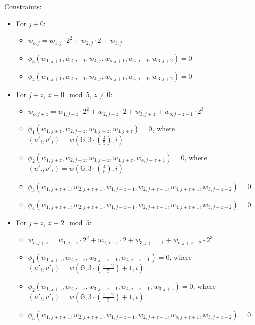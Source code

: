 Constraints:
\begin{itemize}
	\item For $j + 0$:
	\begin{itemize}
		\item $w_{o, j} = w_{1, j} \cdot 2^2 + w_{2, j} \cdot 2 + w_{3, j}$ 
		\item $\phi_3(w_{1, j + 1}, w_{2, j + 1}, w_{4, j}, w_{o, j + 1}, w_{4, j + 1}, w_{3, j + 2}) = 0$
		\item $\phi_4(w_{1, j + 1}, w_{2, j + 1}, w_{4, j}, w_{o, j + 1}, w_{4, j + 1}, w_{3, j + 2}) = 0$
	\end{itemize}
	\item For $j + z$, $z \equiv 0 \mod 5$, $z \neq 0$:
	\begin{itemize}
		\item $w_{o, j + z} = w_{1, j + z} \cdot 2^2 + w_{2, j + z} \cdot 2 + w_{3, j + z} + w_{o, j + z - 1} \cdot 2^3$ 
		\item $\phi_1(w_{1, j + z}, w_{2, j + z}, w_{3, j + z}, w_{4, j + z}) = 0$, where $(u'_{i}, v'_{i}) = w(\mathbb{G}, 3 \cdot (\frac{z}{5}), i)$
		\item $\phi_2(w_{1, j + z}, w_{2, j + z}, w_{3, j + z}, w_{4, j + z}, w_{o, j + z + 1}) = 0$, where $(u'_{i}, v'_{i}) = w(\mathbb{G}, 3 \cdot (\frac{z}{5}), i)$
		\item $\phi_3(w_{1, j + z + 1}, w_{2, j + z + 1}, w_{1, j + z - 1}, w_{2, j + z - 1}, w_{4, j + z + 1}, w_{3, j + z + 2}) = 0$
		\item $\phi_4(w_{1, j + z + 1}, w_{2, j + z + 1}, w_{1, j + z - 1}, w_{2, j + z - 1}, w_{4, j + z + 1}, w_{3, j + z + 2}) = 0$
	\end{itemize}
	\item For $j + z$, $z \equiv 2 \mod 5$:
	\begin{itemize}
		\item $w_{o, j + z} = w_{1, j + z} \cdot 2^2 + w_{2,j + z} \cdot 2 + w_{3, j + z - 1} + w_{o, j+ z - 2} \cdot 2^3$
		\item $\phi_1(w_{1, j + z}, w_{2, j + z}, w_{3, j + z - 1}, w_{4, j + z - 1}) = 0$, where $(u'_{i}, v'_{i}) = w(\mathbb{G}, 3 \cdot (\frac{z - 2}{5}) + 1, i)$
		\item $\phi_2(w_{1, j + z}, w_{2, j + z}, w_{3, j + z - 1}, w_{4, j + z - 1}, w_{3, j + z}) = 0$, where $(u'_{i}, v'_{i}) = w(\mathbb{G}, 3 \cdot (\frac{z - 2}{5}) + 1, i)$
		\item $\phi_3(w_{1, j + z + 1}, w_{2, j + z + 1}, w_{1, j + z - 1}, w_{2, j + z - 1}, w_{o, j + z + 1}, w_{3, j + z + 2}) = 0$

\end{itemize}
\end{itemize}
